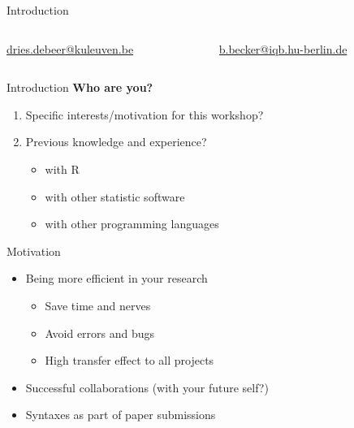 \documentclass[xcolor=table]{beamer}\usepackage[]{graphicx}\usepackage[]{color}
\begin{document}
\begin{frame}{Introduction}
\vspace{0.5cm}

\begin{columns}[t]
\begin{column}{.475\textwidth}

\href{mailto:dries.debeer@kuleuven.be}{dries.debeer@kuleuven.be}
  	
\end{column}
  \begin{column}{.475\textwidth}

\href{b.becker@iqb.hu-berlin.de}{b.becker@iqb.hu-berlin.de}

  \end{column}
\end{columns}

\vspace{1.5em}
\end{frame}

\begin{frame}{Introduction}
\textbf{Who are you?}
\begin{enumerate}%
	\item Specific interests/motivation for this workshop?
	\item Previous knowledge and experience?
	\begin{itemize}
	  \item with R
	  \item with other statistic software
	  \item with other programming languages
	\end{itemize}
\end{enumerate}
\end{frame}

\begin{frame}{Motivation}
	\begin{itemize}
			\item Being more efficient in your research
			\begin{itemize}
			  \item Save time and nerves
			  \item Avoid errors and bugs
			  \item High transfer effect to all projects
			\end{itemize}
			\item Successful collaborations (with your future self?)
			\item Syntaxes as part of paper submissions
	\end{itemize}
\end{frame}
\end{document}
